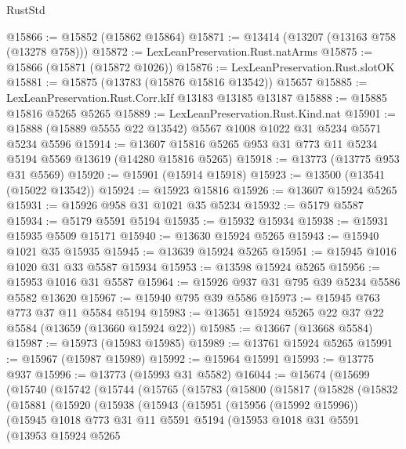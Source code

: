 \begin{lexlean}{RustStd}
\begin{coremodule}
@15866 := @15852 (@15862 @15864)
@15871 := @13414 (@13207 (@13163 @758 (@13278 @758)))
@15872 := LexLeanPreservation.Rust.natArms
@15875 := @15866 (@15871 (@15872 @1026))
@15876 := LexLeanPreservation.Rust.slotOK
@15881 := @15875 (@13783 (@15876 @15816 @13542)) @15657
@15885 := LexLeanPreservation.Rust.Corr.kIf @13183 @13185 @13187
@15888 := @15885 @15816 @5265 @5265
@15889 := LexLeanPreservation.Rust.Kind.nat
@15901 := @15888 (@15889 @5555 @22 @13542) @5567 @1008 @1022 @31 @5234 @5571 @5234 @5596
@15914 := @13607 @15816 @5265 @953 @31 @773 @11 @5234 @5194 @5569 @13619 (@14280 @15816 @5265)
@15918 := @13773 (@13775 @953 @31 @5569)
@15920 := @15901 (@15914 @15918)
@15923 := @13500 (@13541 (@15022 @13542))
@15924 := @15923 @15816
@15926 := @13607 @15924 @5265
@15931 := @15926 @958 @31 @1021 @35 @5234
@15932 := @5179 @5587
@15934 := @5179 @5591 @5194
@15935 := @15932 @15934
@15938 := @15931 @15935 @5509 @15171
@15940 := @13630 @15924 @5265
@15943 := @15940 @1021 @35 @15935
@15945 := @13639 @15924 @5265
@15951 := @15945 @1016 @1020 @31 @33 @5587 @15934
@15953 := @13598 @15924 @5265
@15956 := @15953 @1016 @31 @5587
@15964 := @15926 @937 @31 @795 @39 @5234 @5586 @5582 @13620
@15967 := @15940 @795 @39 @5586
@15973 := @15945 @763 @773 @37 @11 @5584 @5194
@15983 := @13651 @15924 @5265 @22 @37 @22 @5584 (@13659 (@13660 @15924 @22))
@15985 := @13667 (@13668 @5584)
@15987 := @15973 (@15983 @15985)
@15989 := @13761 @15924 @5265
@15991 := @15967 (@15987 @15989)
@15992 := @15964 @15991
@15993 := @13775 @937
@15996 := @13773 (@15993 @31 @5582)
@16044 := @15674
    (@15699
      (@15740
        (@15742
          (@15744
            (@15765
              (@15783
                (@15800
                  (@15817
                    (@15828
                      (@15832
                        (@15881
                          (@15920
                            (@15938
                              (@15943
                                (@15951
                                  (@15956 (@15992 @15996))
                                  (@15945
                                    @1018
                                    @773
                                    @31
                                    @11
                                    @5591
                                    @5194
                                    (@15953
                                      @1018
                                      @31
                                      @5591
                                      (@13953
                                        @15924
                                        @5265

\end{coremodule}
\end{lexlean}

